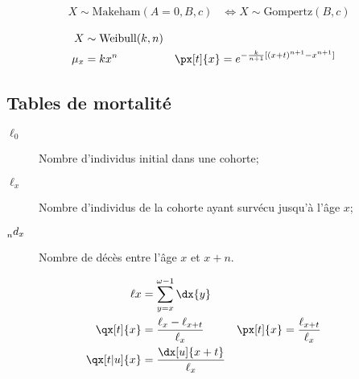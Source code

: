 \documentclass[10pt, french]{article}
\begin{document}
\begin{multicols*}{3}
\begin{rappel_enhanced}
\tcbline

\begin{rappel_enhanced}
	\setlength{\mathindent}{-1cm}
\begin{align*}
	X \sim \text{Makeham}(A = 0, B, c) &\Leftrightarrow X \sim \text{Gompertz}(B, c) 
\end{align*}
	\setlength{\mathindent}{1cm}
\end{rappel_enhanced}
\end{rappel_enhanced}

\begin{rappel_enhanced}
\begin{align*}
	X &\sim \text{Weibull}(k, n) \\
	\mu_x &= k x^n	&
	\px[t]{x} &= e^{-\frac{k}{n + 1}[(x + t)^{n + 1} - x^{n + 1}]}
\end{align*}
\end{rappel_enhanced}


\columnbreak
\subsection{Tables de mortalité}
\begin{distributions}[Notation]
\begin{description}
	\item[$\ell_{0}$]	Nombre d'individus initial dans une cohorte;
	\item[$\ell_{x}$]	Nombre d'individus de la cohorte ayant survécu jusqu'à l'âge $x$;
	\item[$\prescript{}{n}d_{x}$]	Nombre de décès entre l'âge $x$ et $x + n$.
\end{description}
\end{distributions}

\begin{align*}
	\ell{x} 
	&=	\sum_{y = x}^{\omega - 1} \dx{y}	\\
	\qx[t]{x} 
	&=	\frac{\ell_x - \ell_{x+t}}{\ell_x}	&
	\px[t]{x} 
	&=	\frac{\ell_{x+t}}{\ell_x}	\\
	\qx[t|u]{x} 
	&=	\frac{\dx[u]{x+t}}{\ell_x}
\end{align*}




\end{multicols*}
\end{document}
